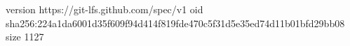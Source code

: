 version https://git-lfs.github.com/spec/v1
oid sha256:224a1da6001d35f609f94d414f819fde470c5f31d5e35ed74d11b01bfd29bb08
size 1127
